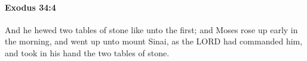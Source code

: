
		\paragraph{Exodus 34:4} %
			\label{EXODUS-34-4}

			And he hewed two tables of stone like unto the first; and Moses rose up early in the morning, and went up unto mount Sinai, as the LORD had commanded him, and took in his hand the two tables of stone.


